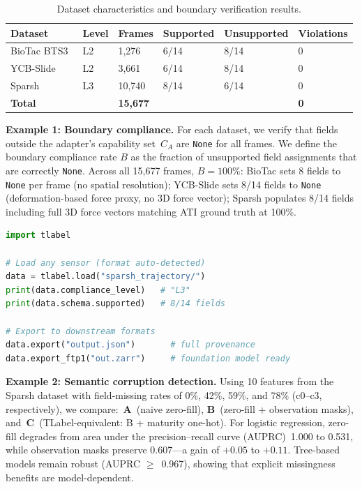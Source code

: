 \documentclass[preprint,12pt,a4paper]{elsarticle}
\begin{document}
\begin{table}[ht]
\centering
\caption{Dataset characteristics and boundary verification results.}
\label{tab:datasets}
\footnotesize
\begin{tabular}{@{}llllll@{}}
\toprule
\textbf{Dataset} & \textbf{Level} & \textbf{Frames} & \textbf{Supported} & \textbf{Unsupported} & \textbf{Violations} \\
\midrule
BioTac BTS3~\cite{zapata2018biotac} & L2 & 1,276 & 6/14 & 8/14 & 0 \\
YCB-Slide~\cite{suresh2022midastouch} & L2 & 3,661 & 6/14 & 8/14 & 0 \\
Sparsh~\cite{kerr2024sparsh} & L3 & 10,740 & 8/14 & 6/14 & 0 \\
\midrule
\textbf{Total} & & \textbf{15,677} & & & \textbf{0} \\
\bottomrule
\end{tabular}
\end{table}

\textbf{Example 1: Boundary compliance.}
For each dataset, we verify that fields outside the adapter's capability set~$C_A$ are \texttt{None} for all frames. We define the boundary compliance rate $B$ as the fraction of unsupported field assignments that are correctly \texttt{None}. Across all 15,677 frames, $B = 100\%$: BioTac sets 8 fields to \texttt{None} per frame (no spatial resolution); YCB-Slide sets 8/14 fields to \texttt{None} (deformation-based force proxy, no 3D force vector); Sparsh populates 8/14 fields including full 3D force vectors matching ATI ground truth at 100\%.

\begin{lstlisting}[language=Python]
import tlabel

# Load any sensor (format auto-detected)
data = tlabel.load("sparsh_trajectory/")
print(data.compliance_level)   # "L3"
print(data.schema.supported)   # 8/14 fields

# Export to downstream formats
data.export("output.json")       # full provenance
data.export_ftp1("out.zarr")     # foundation model ready
\end{lstlisting}

\textbf{Example 2: Semantic corruption detection.}
Using 10 features from the Sparsh dataset with field-missing rates of 0\%, 42\%, 59\%, and 78\% (c0--c3, respectively), we compare:~\textbf{A}~(naive zero-fill), \textbf{B}~(zero-fill + observation masks), and~\textbf{C}~(TLabel-equivalent: B + maturity one-hot). For logistic regression, zero-fill degrades from area under the precision--recall curve (AUPRC)~1.000 to 0.531, while observation masks preserve 0.607---a gain of $+0.05$ to $+0.11$. Tree-based models remain robust (AUPRC $\geq$~0.967), showing that explicit missingness benefits are model-dependent.
\end{document}
